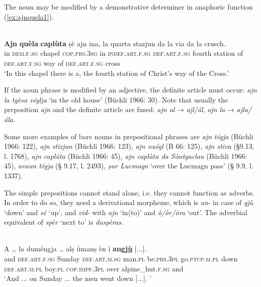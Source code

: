 The noun may be modified by a demonstrative determiner in anaphoric function (\ref{ex:ajnquela1}).

\ea
\label{ex:ajnquela1}
\\
\gll \textbf{Ajn} \textbf{quèla} \textbf{caplùta} ṣè ajn ina, la quarta stazjun da la via da la crusch.\\
in \textsc{dem.f.sg} chapel \textsc{cop.prs.3sg} in \textsc{indef.art.f.sg} \textsc{def.art.f.sg} fourth station of \textsc{def.art.f.sg} way of \textsc{def.art.f.sg} cross \\
\glt `In this chapel there is a, the fourth station of Christ’s way of the Cross.'
\z

If the noun phrase is modified by an adjective, the definite article must occur: \textit{ajn la tgèsa véglja} `in the old house' (Büchli 1966: 30). Note that usually the preposition \textit{ajn} and the definite article are fused: \textit{ajn al} → \textit{ajl/ál}, \textit{ajn la} → \textit{ajla/ála}.

Some more examples of bare nouns in prepositional phrases are \textit{ajn tégja} (Büchli 1966: 122), \textit{ajn stizjun} (Büchli 1966: 123), \textit{ajn nuégl} (B 66: 125), \textit{ajn stiva} (§9.13, l. 1768), \textit{ajn caplùta} (Büchli 1966: 45), \textit{ajn caplùta da Sòntgaclau} (Büchli 1966: 45), \textit{avaun tégja} (§ 9.17, l. 2493), \textit{ṣur Lucmagn} `over the Lucmagn pass' (§ 9.9, l. 1337).


The simple prepositions cannot stand alone, i.e. they cannot function as adverbs. In order to do so, they need a derivational morpheme, which is \textit{an}- in case of \textit{gjù} `down' and \textit{sé} `up', and \textit{vid}- with \textit{ajn} `in(to)' and \textit{ò/òr/òra} `out'. The adverbial equivalent of \textit{spèr} `next to' is \textit{daspèras}.

\ea
\label{}
\\
\gll A … la duméngja … alṣ ùmanṣ èn ì \textbf{angj\underline{ù}} [...].\\
{} and {} \textsc{def.art.f.sg} Sunday {} \textsc{def.art.m.sg} man.\textsc{pl} be.\textsc{prs.3pl} go.\textsc{ptcp.m.pl} down {} \textsc{def.art.m.pl} boy.\textsc{pl} \textsc{cop.impf.3pl} over alpine\_hut.\textsc{f.sg} {} and\\
\glt `And ... on Sunday ... the men went down [...]. '
\z

